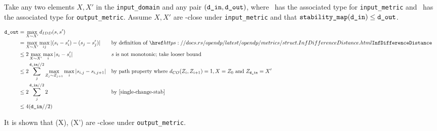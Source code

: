 \documentclass{article}
\begin{document}
Take any two elements $X, X'$ in the \texttt{input\_domain} and any pair $(\texttt{d\_in}, \texttt{d\_out})$, 
where \din\ has the associated type for \texttt{input\_metric} and \dout\ has the associated type for \texttt{output\_metric}.
Assume $X, X'$ are \din-close under \texttt{input\_metric} and that $\texttt{stability\_map}(\texttt{d\_in}) \leq \texttt{d\_out}$. 

\begin{align*}
    \dout &= \max\limits_{X \sim X'} d_{IDD}(s, s') \\
    &= \max\limits_{X \sim X'} \max\limits_{ij} |(s_i - s'_i) - (s_j - s'_j)| &&\text{by definition of }\rustdoc{metrics/struct}{InfDifferenceDistance} \\
    &\leq 2 \max\limits_{X \sim X'} \max\limits_{i} |s_i - s'_i| &&\text{$s$ is not monotonic; take looser bound}\\
    &\leq 2 \sum_j^{\din // 2} \max\limits_{Z_{j} \sim Z_{j+1}} \max\limits_{i} |s_{i,j} - s_{i,j+1}| &&\text{by path property where } d_{CO}(Z_i, Z_{i+1}) = 1, X = Z_0 \text{ and } Z_\din = X' \\
    &\leq 2 \sum_j^{\din // 2} 2 &&\text{by \ref{single-change-stab}} \\
    &\leq 4 (\din // 2) \\
\end{align*}


It is shown that \function(X), \function(X') are \dout-close under \texttt{output\_metric}.
\end{document}
